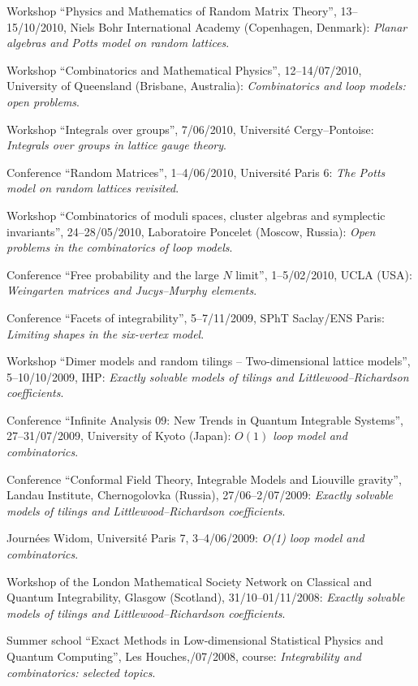 \s Workshop ``Physics and Mathematics of Random Matrix Theory'', 13--15/10/2010, Niels Bohr International Academy (Copenhagen, Denmark):
{\sl Planar algebras and Potts model on random lattices}.

\s Workshop ``Combinatorics and Mathematical Physics'', 12--14/07/2010, University of Queensland (Brisbane, Australia):
{\sl Combinatorics and loop models: open problems}.

\s Workshop ``Integrals over groups'', 7/06/2010, Universit\'e Cergy--Pontoise:
{\sl Integrals over groups in lattice gauge theory}.

\s Conference ``Random Matrices'', 1--4/06/2010, Universit\'e Paris 6:
{\sl The Potts model on random lattices revisited}.

\s Workshop ``Combinatorics of moduli spaces, cluster algebras and symplectic invariants'', 24--28/05/2010, Laboratoire Poncelet (Moscow, Russia):
{\sl Open problems in the combinatorics of loop models}.

\s Conference ``Free probability and the large $N$ limit'',
1--5/02/2010, UCLA (USA):
{\sl Weingarten matrices and Jucys--Murphy elements}.

\s Conference ``Facets of integrability'', 
5--7/11/2009, SPhT Saclay/ENS Paris:
{\sl Limiting shapes in the six-vertex model}.

\s Workshop ``Dimer models and random tilings --
Two-dimensional lattice models'', 5--10/10/2009, IHP:
{\sl Exactly solvable models of tilings and Littlewood--Richardson coefficients}.

\s Conference ``Infinite Analysis 09: New Trends in Quantum Integrable Systems'', 27--31/07/2009, University of Kyoto (Japan): 
{\sl $O(1)$ loop model and combinatorics}.


\s Conference ``Conformal Field Theory, Integrable Models and Liouville gravity'', Landau Institute, Chernogolovka (Russia), 27/06--2/07/2009:
{\sl Exactly solvable models of tilings and Littlewood--Richardson coefficients}.

\s Journ\'ees Widom, Universit\'e Paris 7, 3--4/06/2009:
{\sl O(1) loop model and combinatorics}.

\s Workshop of the London Mathematical Society Network on Classical and Quantum Integrability, Glasgow (Scotland), 31/10--01/11/2008: {\sl Exactly solvable models of tilings and Littlewood--Richardson coefficients}.

\s Summer school ``Exact Methods in Low-dimensional Statistical Physics
and Quantum Computing'', Les Houches,/07/2008, course: {\sl Integrability and combinatorics: selected topics}.

